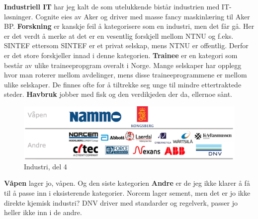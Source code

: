 \textbf{Industriell IT} har jeg kalt de som utelukkende bistår industrien med IT-løsninger. Cognite eies av Aker og driver med masse fancy maskinlæring til Aker BP.
\textbf{Forskning} er kanskje feil å kategorisere som en industri, men det får gå. Her er det verdt å merke at det er en vesentlig forskjell mellom NTNU og f.eks. SINTEF ettersom SINTEF er et privat selskap, mens NTNU er offentlig. Derfor er det store forskjeller innad i denne kategorien. \textbf{Trainee} er en kategori som består av ulike traineepropgram overalt i Norge. Mange selskaper har opplegg hvor man roterer mellom avdelinger, mens disse traineeprogrammene er mellom ulike selskaper. De finnes ofte for å tiltrekke seg unge til mindre ettertraktede steder. \textbf{Havbruk} jobber med fisk og den verdikjeden der da, ellernoe sånt. 

\begin{figure}[H]
    \centering
    \includegraphics[width=1\linewidth]{images/Industri4.pdf}
    \caption{Industri, del 4}
    \label{fig:industri4}
\end{figure}

\textbf{Våpen} lager jo, våpen. Og den siste kategorien \textbf{Andre} er de jeg ikke klarer å få til å passe inn i eksisterende kategorier. Norcem lager sement, men det er jo ikke direkte kjemisk industri? DNV driver med standarder og regelverk, passer jo heller ikke inn i de andre. 